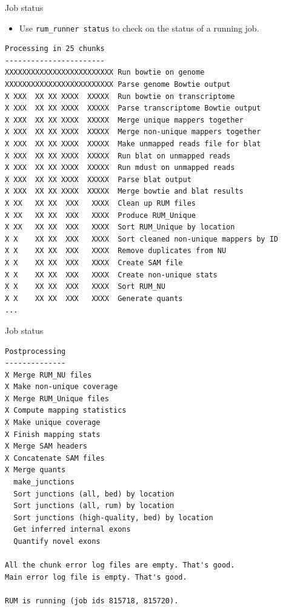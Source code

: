 \documentclass{beamer}
\begin{document}
\begin{frame}[fragile]{Job status}
  \begin{itemize}
  \item Use \texttt{rum\_runner status} to check on the status of a
    running job.
  \end{itemize}
  \tiny
\begin{verbatim}
Processing in 25 chunks
-----------------------
XXXXXXXXXXXXXXXXXXXXXXXXX Run bowtie on genome
XXXXXXXXXXXXXXXXXXXXXXXXX Parse genome Bowtie output
X XXX  XX XX XXXX  XXXXX  Run bowtie on transcriptome
X XXX  XX XX XXXX  XXXXX  Parse transcriptome Bowtie output
X XXX  XX XX XXXX  XXXXX  Merge unique mappers together
X XXX  XX XX XXXX  XXXXX  Merge non-unique mappers together
X XXX  XX XX XXXX  XXXXX  Make unmapped reads file for blat
X XXX  XX XX XXXX  XXXXX  Run blat on unmapped reads
X XXX  XX XX XXXX  XXXXX  Run mdust on unmapped reads
X XXX  XX XX XXXX  XXXXX  Parse blat output
X XXX  XX XX XXXX  XXXXX  Merge bowtie and blat results
X XX   XX XX  XXX   XXXX  Clean up RUM files
X XX   XX XX  XXX   XXXX  Produce RUM_Unique
X XX   XX XX  XXX   XXXX  Sort RUM_Unique by location
X X    XX XX  XXX   XXXX  Sort cleaned non-unique mappers by ID
X X    XX XX  XXX   XXXX  Remove duplicates from NU
X X    XX XX  XXX   XXXX  Create SAM file
X X    XX XX  XXX   XXXX  Create non-unique stats
X X    XX XX  XXX   XXXX  Sort RUM_NU
X X    XX XX  XXX   XXXX  Generate quants
...
\end{verbatim}
\end{frame}

\begin{frame}[fragile]{Job status}
\tiny
\begin{verbatim}
Postprocessing
--------------
X Merge RUM_NU files
X Make non-unique coverage
X Merge RUM_Unique files
X Compute mapping statistics
X Make unique coverage
X Finish mapping stats
X Merge SAM headers
X Concatenate SAM files
X Merge quants
  make_junctions
  Sort junctions (all, bed) by location
  Sort junctions (all, rum) by location
  Sort junctions (high-quality, bed) by location
  Get inferred internal exons
  Quantify novel exons

All the chunk error log files are empty. That's good.
Main error log file is empty. That's good.

RUM is running (job ids 815718, 815720).
\end{verbatim}
\end{frame}
\end{document}
